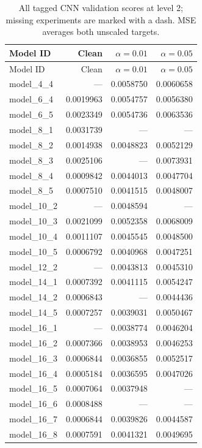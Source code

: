 \begingroup\footnotesize\setlength{\tabcolsep}{3pt}\renewcommand{\arraystretch}{1.05}
\begin{longtable}{lrrr}
\caption{All tagged CNN validation scores at level 2; missing experiments are marked with a dash. MSE averages both unscaled targets.}\label{tab:cnn2}\\
\toprule
Model ID & Clean & $\alpha=0.01$ & $\alpha=0.05$ \\
\midrule
\endfirsthead
\toprule
Model ID & Clean & $\alpha=0.01$ & $\alpha=0.05$ \\
\midrule\endhead
\bottomrule\endfoot
model\_4\_4 & --- & 0.0058750 & 0.0060658 \\
model\_6\_4 & 0.0019963 & 0.0054757 & 0.0056380 \\
model\_6\_5 & 0.0023349 & 0.0054736 & 0.0063536 \\
model\_8\_1 & 0.0031739 & --- & --- \\
model\_8\_2 & 0.0014938 & 0.0048823 & 0.0052129 \\
model\_8\_3 & 0.0025106 & --- & 0.0073931 \\
model\_8\_4 & 0.0009842 & 0.0044013 & 0.0047704 \\
model\_8\_5 & 0.0007510 & 0.0041515 & 0.0048007 \\
model\_10\_2 & --- & 0.0048594 & --- \\
model\_10\_3 & 0.0021099 & 0.0052358 & 0.0068009 \\
model\_10\_4 & 0.0011107 & 0.0045545 & 0.0048500 \\
model\_10\_5 & 0.0006792 & 0.0040968 & 0.0047251 \\
model\_12\_2 & --- & 0.0043813 & 0.0045310 \\
model\_14\_1 & 0.0007392 & 0.0041115 & 0.0054247 \\
model\_14\_2 & 0.0006843 & --- & 0.0044436 \\
model\_14\_5 & 0.0007257 & 0.0039031 & 0.0050467 \\
model\_16\_1 & --- & 0.0038774 & 0.0046204 \\
model\_16\_2 & 0.0007366 & 0.0038953 & 0.0046253 \\
model\_16\_3 & 0.0006844 & 0.0036855 & 0.0052517 \\
model\_16\_4 & 0.0005184 & 0.0036595 & 0.0047026 \\
model\_16\_5 & 0.0007064 & 0.0037948 & --- \\
model\_16\_6 & 0.0008488 & --- & --- \\
model\_16\_7 & 0.0006844 & 0.0039826 & 0.0044587 \\
model\_16\_8 & 0.0007591 & 0.0041321 & 0.0049695 \\
\end{longtable}\endgroup
